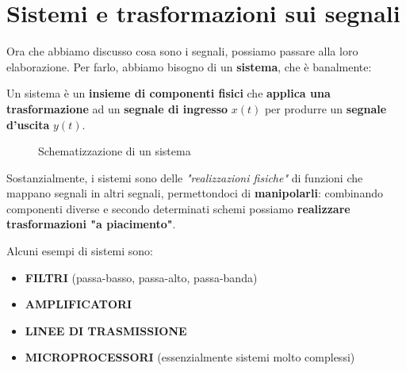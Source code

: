 
\chapter{Sistemi e trasformazioni sui segnali}

Ora che abbiamo discusso cosa sono i segnali, possiamo passare alla loro elaborazione.
Per farlo, abbiamo bisogno di un \textbf{sistema}, che è banalmente:

\begin{definition}[SISTEMA]
    Un sistema è un \textbf{insieme di componenti fisici} che 
    \textbf{applica una trasformazione} ad un \textbf{segnale di ingresso} $x(t)$
    per produrre un \textbf{segnale d'uscita} $y(t)$.
\end{definition}

\begin{figure}[!ht]
    \centering
    \caption{Schematizzazione di un sistema}
\end{figure}

Sostanzialmente, i sistemi sono delle \textit{"realizzazioni fisiche"} di funzioni 
che mappano segnali in altri segnali, permettondoci di \textbf{manipolarli}: combinando
componenti diverse e secondo determinati schemi possiamo \textbf{realizzare trasformazioni
"a piacimento"}.

Alcuni esempi di sistemi sono:
\begin{itemize}
    \item \textbf{FILTRI} (passa-basso, passa-alto, passa-banda)
    \item \textbf{AMPLIFICATORI}
    \item \textbf{LINEE DI TRASMISSIONE}
    \item \textbf{MICROPROCESSORI} (essenzialmente sistemi molto complessi)
\end{itemize}

